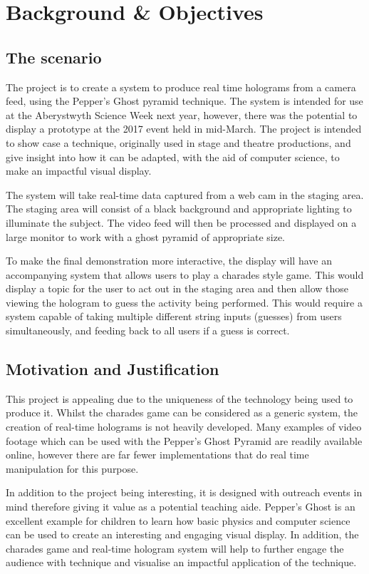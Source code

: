 \chapter{Background \& Objectives}
\section{The scenario}
The project is to create a system to produce real time holograms from a camera feed, using the Pepper's Ghost pyramid technique. The system is intended for use at the Aberystwyth Science Week next year, however, there was the potential to display a prototype at the 2017 event held in mid-March. The project is intended to show case a technique, originally used in stage and theatre productions, and give insight into how it can be adapted, with the aid of computer science, to make an impactful visual display.

The system will take real-time data captured from a web cam in the  staging area. The staging area will consist of a black background and appropriate lighting to illuminate the subject. The video feed will then be processed and displayed on a large monitor to work with a ghost pyramid of appropriate size.

To make the final demonstration more interactive, the display will have an accompanying system that allows users to play a charades style game. This would display a topic for the user to act out in the staging area and then allow those viewing the hologram to guess the activity being performed. This would require a system capable of taking multiple different string inputs (guesses) from users simultaneously, and feeding back to all users if a guess is correct. 

\section{Motivation and Justification}
This project is appealing due to the uniqueness of the technology being used to produce it. Whilst the charades game can be considered as a generic system, the creation of real-time holograms is not heavily developed. Many examples of video footage which can be used with the Pepper's Ghost Pyramid are readily available online, however there are far fewer implementations that do real time manipulation for this purpose.

In addition to the project being interesting, it is designed with outreach events in mind therefore giving it value as a potential teaching aide. Pepper's Ghost is an excellent example for children to learn how basic physics and computer science can be used to create an interesting and engaging visual display. In addition, the charades game and real-time hologram system will help to further engage the audience with technique and visualise an impactful application of the technique. 

